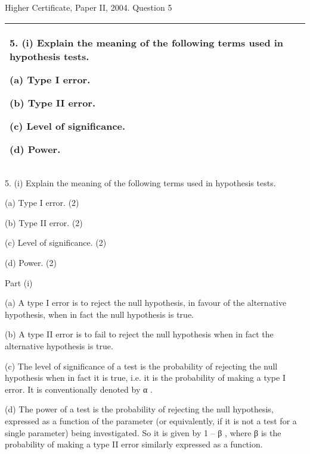 \documentclass[a4paper,12pt]{article}
\begin{document}
Higher Certificate, Paper II, 2004.  Question 5 


\begin{table}[ht!]
 
\centering
 
\begin{tabular}{|p{15cm}|}
 
\hline  

5. (i) Explain the meaning of the following terms used in hypothesis tests. 
 
 (a) Type I error. 

 
 (b) Type II error. 

 
 (c) Level of significance. 

 
 (d) Power. 

 

\\ \hline
  
\end{tabular}

\end{table} 





\begin{framed}
5. (i) Explain the meaning of the following terms used in hypothesis tests. 
 
 (a) Type I error. 
(2) 
 
 (b) Type II error. 
(2) 
 
 (c) Level of significance. 
(2) 
 
 (d) Power. 
(2) 
\end{framed}

Part (i) 
 
(a) A type I error is to reject the null hypothesis, in favour of the alternative hypothesis, when in fact the null hypothesis is true. 
 
(b) A type II error is to fail to reject the null hypothesis when in fact the alternative hypothesis is true. 
 
(c) The level of significance of a test is the probability of rejecting the null hypothesis when in fact it is true, i.e. it is the probability of making a type I error.  It is conventionally denoted by α . 
 
(d) The power of a test is the probability of rejecting the null hypothesis, expressed as a function of the parameter (or equivalently, if it is not a test for a single parameter) being investigated.  So it is given by 1 – β , where β is the probability of making a type II error similarly expressed as a function. 
 
\end{document}
